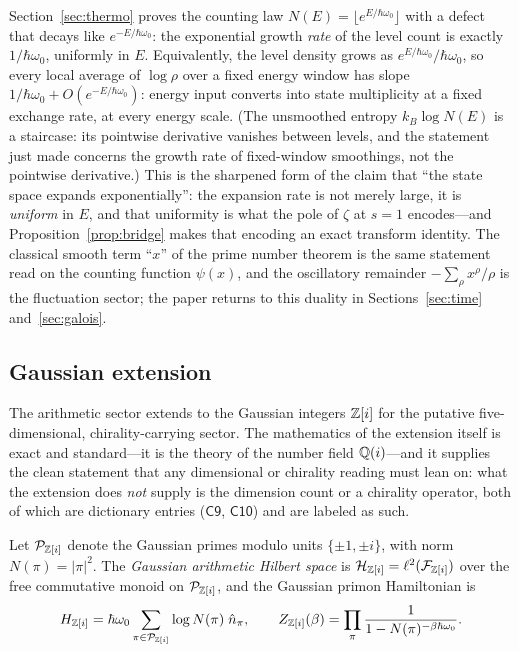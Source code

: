 \begin{remark}
Section~\ref{sec:thermo} proves the counting law $N(E)=\lfloor e^{E/\hbar\omega_{0}}\rfloor$
with a defect that decays like $e^{-E/\hbar\omega_{0}}$: the exponential growth \emph{rate} of
the level count is exactly $1/\hbar\omega_{0}$, uniformly in $E$. Equivalently, the level
density grows as $e^{E/\hbar\omega_{0}}/\hbar\omega_{0}$, so every local average of $\log\rho$ over
a fixed energy window has slope $1/\hbar\omega_{0}+O(e^{-E/\hbar\omega_{0}})$: energy input
converts into state multiplicity at a fixed exchange rate, at every energy scale. (The
unsmoothed entropy $k_{B}\log N(E)$ is a staircase: its pointwise derivative vanishes between
levels, and the statement just made concerns the growth rate of fixed-window smoothings, not
the pointwise derivative.) This is the sharpened form of the claim that ``the state space
expands exponentially'': the expansion rate is not
merely large, it is \emph{uniform} in $E$, and that uniformity is what the pole of $\zeta$ at
$s=1$ encodes---and Proposition~\ref{prop:bridge} makes that encoding an exact
transform identity. The classical smooth term ``$x$'' of the prime number theorem is the same
statement read on the counting function $\psi(x)$, and the oscillatory remainder
$-\sum_{\rho}x^{\rho}/\rho$ is the fluctuation sector; the paper returns
to this duality in Sections~\ref{sec:time} and~\ref{sec:galois}.
\end{remark}

\subsection{Gaussian extension}

The arithmetic sector extends to the Gaussian integers $\mathbb{Z}[i]$ for the putative
five-dimensional, chirality-carrying sector. The mathematics of the extension itself is exact
and standard---it is the theory of the number field $\mathbb{Q}(i)$---and it supplies the clean
statement that any dimensional or chirality reading must lean on: what the extension does
\emph{not} supply is the dimension count or a chirality operator, both of which are dictionary
entries ($\mathsf{C9}$, $\mathsf{C10}$) and are labeled as such.

\begin{definition}\label{def:gaussian}
Let $\mathcal{P}_{\mathbb{Z}[i]}$ denote the Gaussian primes modulo units $\{\pm1,\pm i\}$, with norm
$N(\pi)=|\pi|^{2}$. The \emph{Gaussian arithmetic Hilbert space} is
$\mathcal{H}_{\mathbb{Z}[i]}=\ell^{2}(\mathcal{F}_{\mathbb{Z}[i]})$ over the free commutative monoid on
$\mathcal{P}_{\mathbb{Z}[i]}$, and the Gaussian primon Hamiltonian is
\begin{equation}
H_{\mathbb{Z}[i]}=\hbar\omega_{0}\sum_{\pi\in\mathcal{P}_{\mathbb{Z}[i]}}\log N(\pi)\;\hat n_{\pi},
\qquad
Z_{\mathbb{Z}[i]}(\beta)=\prod_{\pi}\frac{1}{1-N(\pi)^{-\beta\hbar\omega_{0}}}.
\end{equation}
\end{definition}

